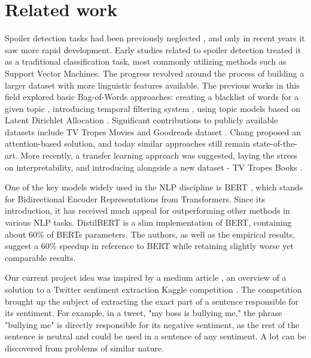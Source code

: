 \documentclass[11pt]{article}
\begin{document}
\section{Related work} \label{related-work}
Spoiler detection tasks had been previously neglected \cite{wan2019fine}, and only in recent years it saw more rapid development. Early studies related to spoiler detection treated it as a traditional classification task, most commonly utilizing methods such as Support Vector Machines. The progress revolved around the process of building a larger dataset with more linguistic features available. The previous works in this field explored basic Bag-of-Words approaches: creating a blacklist of words for a given topic \cite{golbeck2012twitter}, introducing temporal filtering system \cite{nakamura2007temporal}, using topic models based on Latent Dirichlet Allocation \cite{guo2010finding}. Significant contributions to publicly available datasets include TV Tropes Movies \cite{boyd2013spoiler} and Goodreads dataset \cite{wan2019fine}. Chang  proposed an attention-based solution, and today similar approaches still remain state-of-the-art. More recently, a transfer learning approach was suggested, laying the stress on interpretability, and introducing alongside a new dataset - TV Tropes Books \cite{wroblewska2021spoiler}.

One of the key models widely used in the NLP discipline is BERT \cite{devlin2018bert}, which stands for Bidirectional Encoder Representations from Transformers. Since its introduction, it has received much appeal for outperforming other methods in various NLP tasks. DistilBERT \cite{sanh2019distilbert} is a slim implementation of BERT, containing about 60\% of BERTs parameters. The authors, as well as the empirical results, suggest a 60\% speedup in reference to BERT while retaining slightly worse yet comparable results. 

Our current project idea was inspired by a medium article \cite{medium_extract}, an overview of a solution to a Twitter sentiment extraction Kaggle competition \cite{kaggle_comp}. The competition brought up the subject of extracting the exact part of a sentence responsible for its sentiment. For example, in a tweet, "my boss is bullying me," the phrase "bullying me" is directly responsible for its negative sentiment, as the rest of the sentence is neutral and could be used in a sentence of any sentiment. A lot can be discovered from problems of similar nature. 
\end{document}
